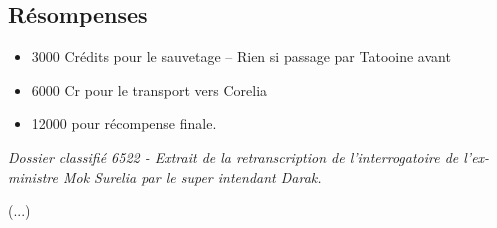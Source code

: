 \documentclass[a4paper,10pt,twoside,twocolumn,openany]{book}
\begin{document}
\subsection{Résompenses}

\begin{itemize}
    \item 3000 Crédits pour le sauvetage – Rien si passage par Tatooine avant
    \item 6000 Cr pour le transport vers Corelia
    \item 12000 pour récompense finale.
\end{itemize}

\begin{quotebox}

 \emph{
Dossier classifié 6522 - Extrait de la retranscription de l'interrogatoire de l'ex-ministre Mok Surelia par le super intendant Darak.}

(...)
\begin{dialogue}


\end{dialogue}
\end{quotebox}
\end{document}
